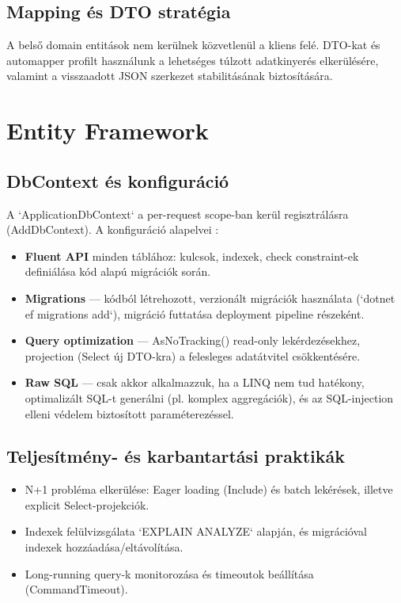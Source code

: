 \documentclass[colorlinks]{docs}
\theoremstyle{definition}
\theoremstyle{remark}
\begin{document}
\subsection{Mapping és DTO stratégia}
A belső domain entitások nem kerülnek közvetlenül a kliens felé. DTO-kat és automapper profilt használunk a lehetséges túlzott adatkinyerés elkerülésére, valamint a visszaadott JSON szerkezet stabilitásának biztosítására.

\section{Entity Framework}
\subsection{DbContext és konfiguráció}
A `ApplicationDbContext` a per-request scope-ban kerül regisztrálásra (AddDbContext). A konfiguráció alapelvei \cite{efcore}:
\begin{itemize}
    \item \textbf{Fluent API} minden táblához: kulcsok, indexek, check constraint-ek definiálása kód alapú migrációk során.
    \item \textbf{Migrations} — kódból létrehozott, verzionált migrációk használata (`dotnet ef migrations add`), migráció futtatása deployment pipeline részeként.
    \item \textbf{Query optimization} — AsNoTracking() read-only lekérdezésekhez, projection (Select új DTO-kra) a felesleges adatátvitel csökkentésére.
    \item \textbf{Raw SQL} — csak akkor alkalmazzuk, ha a LINQ nem tud hatékony, optimalizált SQL-t generálni (pl. komplex aggregációk), és az SQL-injection elleni védelem biztosított paraméterezéssel.
\end{itemize}

\subsection{Teljesítmény- és karbantartási praktikák}
\begin{itemize}
    \item N+1 probléma elkerülése: Eager loading (Include) és batch lekérések, illetve explicit Select-projekciók.
    \item Indexek felülvizsgálata `EXPLAIN ANALYZE` alapján, és migrációval indexek hozzáadása/eltávolítása.
    \item Long-running query-k monitorozása és timeoutok beállítása (CommandTimeout).
\end{itemize}
\end{document}
